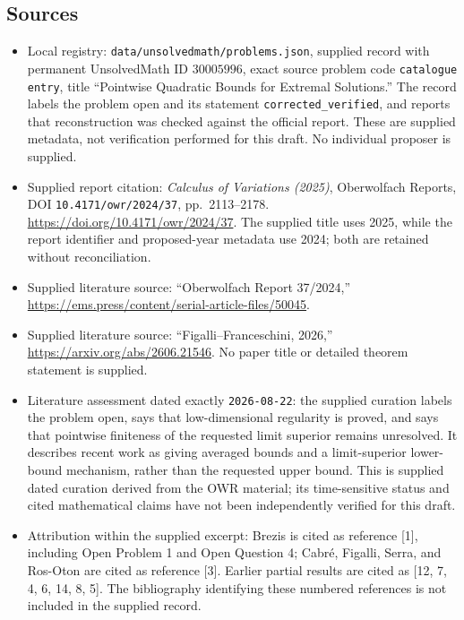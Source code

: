 \documentclass[11pt]{article}
\begin{document}
\subsection{Sources}
\begin{itemize}
\item Local registry: \texttt{data/unsolvedmath/problems.json}, supplied record with permanent UnsolvedMath ID \(30005996\), exact source problem code \texttt{catalogue entry}, title ``Pointwise Quadratic Bounds for Extremal Solutions.'' The record labels the problem open and its statement \texttt{corrected\_verified}, and reports that reconstruction was checked against the official report. These are supplied metadata, not verification performed for this draft. No individual proposer is supplied.
\item Supplied report citation: \emph{Calculus of Variations (2025)}, Oberwolfach Reports, DOI \texttt{10.4171/owr/2024/37}, pp.\ 2113--2178. \url{https://doi.org/10.4171/owr/2024/37}. The supplied title uses 2025, while the report identifier and proposed-year metadata use 2024; both are retained without reconciliation.
\item Supplied literature source: ``Oberwolfach Report 37/2024,'' \url{https://ems.press/content/serial-article-files/50045}.
\item Supplied literature source: ``Figalli--Franceschini, 2026,'' \url{https://arxiv.org/abs/2606.21546}. No paper title or detailed theorem statement is supplied.
\item Literature assessment dated exactly \texttt{2026-08-22}: the supplied curation labels the problem open, says that low-dimensional regularity is proved, and says that pointwise finiteness of the requested limit superior remains unresolved. It describes recent work as giving averaged bounds and a limit-superior lower-bound mechanism, rather than the requested upper bound. This is supplied dated curation derived from the OWR material; its time-sensitive status and cited mathematical claims have not been independently verified for this draft.
\item Attribution within the supplied excerpt: Brezis is cited as reference [1], including Open Problem 1 and Open Question 4; Cabr\'e, Figalli, Serra, and Ros-Oton are cited as reference [3]. Earlier partial results are cited as [12, 7, 4, 6, 14, 8, 5]. The bibliography identifying these numbered references is not included in the supplied record.
\end{itemize}
\end{document}
